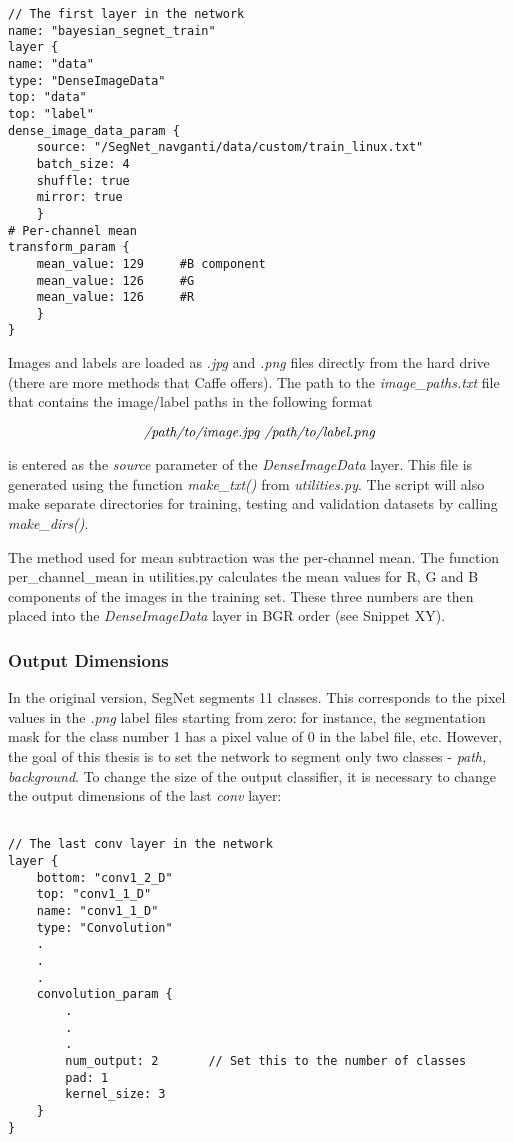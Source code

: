 \begin{lstlisting}
// The first layer in the network
name: "bayesian_segnet_train"
layer {
name: "data"
type: "DenseImageData"
top: "data"
top: "label"
dense_image_data_param {
	source: "/SegNet_navganti/data/custom/train_linux.txt"
	batch_size: 4   			    			
	shuffle: true
	mirror: true	
	}
# Per-channel mean
transform_param {
	mean_value: 129		#B component
	mean_value: 126		#G
	mean_value: 126		#R
	}
}
\end{lstlisting} 

Images and labels are loaded as \textit{.jpg} and \textit{.png} files directly from the hard drive (there are more methods that Caffe offers). The path to the \textit{image\_paths.txt} file that contains the image/label paths in the following format

$$
\text{\textit{/path/to/image.jpg /path/to/label.png}}
$$

\noindent is entered as the \textit{source} parameter of the \textit{DenseImageData} layer. This file is generated using the function \textit{make\_txt()} from \textit{utilities.py}. The script will also make separate directories for training, testing and validation datasets by calling \textit{make\_dirs()}.

The method used for mean subtraction was the per-channel mean. The function per\_channel\_mean in utilities.py calculates the mean values for R, G and B components of the images in the training set. These three numbers are then placed into the \textit{DenseImageData} layer in BGR order (see Snippet XY).

\subsubsection{Output Dimensions}

In the original version, SegNet segments 11 classes. This corresponds to the pixel values in the \textit{.png} label files starting from zero: for instance, the segmentation mask for the class number 1 has a pixel value of 0 in the label file, etc. However, the goal of this thesis is to set the network to segment only two classes - \textit{path, background}. To change the size of the output classifier, it is necessary to change the output dimensions of the last \textit{conv} layer:

\begin{lstlisting}

// The last conv layer in the network
layer {
	bottom: "conv1_2_D"
	top: "conv1_1_D"
	name: "conv1_1_D"
	type: "Convolution"
	.
	.
	.
	convolution_param {
		.
		.
		.
		num_output: 2		// Set this to the number of classes
		pad: 1
		kernel_size: 3
	}
}
\end{lstlisting}

